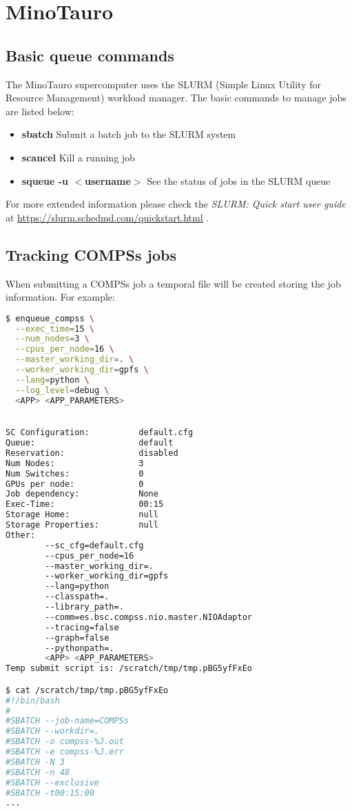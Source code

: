\section{MinoTauro}
\label{sec:minotauro}

\subsection{Basic queue commands}

The MinoTauro supercomputer uses the SLURM (Simple Linux Utility for Resource Management) workload manager. The basic commands 
to manage jobs are listed below:

\begin{itemize}
 \item \textbf{sbatch} Submit a batch job to the SLURM system
 \item \textbf{scancel} Kill a running job 
 \item \textbf{squeue -u $<$username$>$} See the status of jobs in the SLURM queue
\end{itemize}

For more extended information please check the \textit{SLURM: Quick start user guide} at 
\url{https://slurm.schedmd.com/quickstart.html} .


\subsection{Tracking COMPSs jobs}

When submitting a COMPSs job a temporal file will be created storing the job information. For example:

\begin{lstlisting}[language=bash]
$ enqueue_compss \
  --exec_time=15 \
  --num_nodes=3 \
  --cpus_per_node=16 \
  --master_working_dir=. \
  --worker_working_dir=gpfs \
  --lang=python \
  --log_level=debug \
  <APP> <APP_PARAMETERS>

  
SC Configuration:          default.cfg
Queue:                     default
Reservation:               disabled
Num Nodes:                 3
Num Switches:              0
GPUs per node:             0
Job dependency:            None
Exec-Time:                 00:15
Storage Home:              null
Storage Properties:        null
Other:                     
        --sc_cfg=default.cfg
        --cpus_per_node=16
        --master_working_dir=.
        --worker_working_dir=gpfs
        --lang=python
        --classpath=.
        --library_path=.
        --comm=es.bsc.compss.nio.master.NIOAdaptor
        --tracing=false
        --graph=false
        --pythonpath=.
        <APP> <APP_PARAMETERS>
Temp submit script is: /scratch/tmp/tmp.pBG5yfFxEo

$ cat /scratch/tmp/tmp.pBG5yfFxEo
#!/bin/bash
#
#SBATCH --job-name=COMPSs
#SBATCH --workdir=. 
#SBATCH -o compss-%J.out
#SBATCH -e compss-%J.err
#SBATCH -N 3
#SBATCH -n 48
#SBATCH --exclusive
#SBATCH -t00:15:00 
...
\end{lstlisting}

